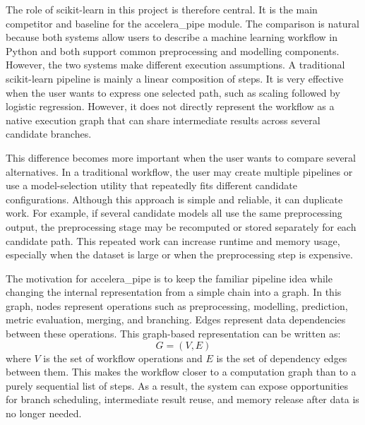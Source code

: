 \documentclass[12pt,a4paper,oneside]{report}
\begin{document}
The role of scikit-learn in this project is therefore central. It is
the main competitor and baseline for the accelera\_pipe module. The
comparison is natural because both systems allow users to describe a machine
learning workflow in Python and both support common preprocessing and modelling
components. However, the two systems make different execution assumptions. A
traditional scikit-learn pipeline is mainly a linear composition of
steps. It is very effective when the user wants to express one selected path,
such as scaling followed by logistic regression. However, it does not directly
represent the workflow as a native execution graph that can share intermediate
results across several candidate branches.

This difference becomes more important when the user wants to compare several
alternatives. In a traditional workflow, the user may create multiple pipelines
or use a model-selection utility that repeatedly fits different candidate
configurations. Although this approach is simple and reliable, it can duplicate
work. For example, if several candidate models all use the same preprocessing
output, the preprocessing stage may be recomputed or stored separately for each
candidate path. This repeated work can increase runtime and memory usage,
especially when the dataset is large or when the preprocessing step is expensive.

The motivation for accelera\_pipe is to keep the familiar pipeline
idea while changing the internal representation from a simple chain into a graph.
In this graph, nodes represent operations such as preprocessing, modelling,
prediction, metric evaluation, merging, and branching. Edges represent data
dependencies between these operations. This graph-based representation can be
written as:
\[
G = (V, E)
\]
where \(V\) is the set of workflow operations and \(E\) is the set of dependency
edges between them. This makes the workflow closer to a computation graph than
to a purely sequential list of steps. As a result, the system can expose
opportunities for branch scheduling, intermediate result reuse, and memory
release after data is no longer needed.
\end{document}
